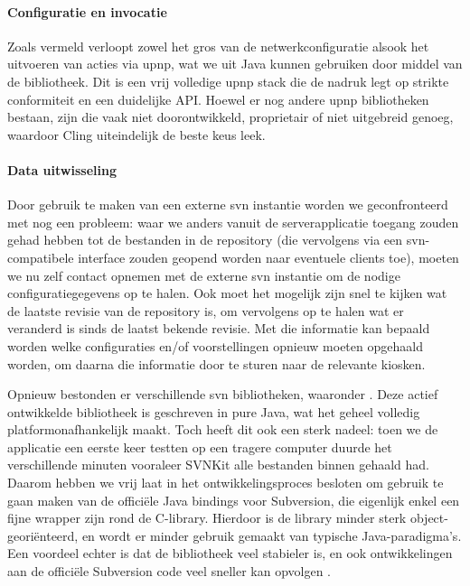 \paragraph{Configuratie en invocatie} Zoals vermeld verloopt zowel het gros van de netwerkconfiguratie alsook het uitvoeren van acties via \ac{upnp}, wat we uit Java kunnen gebruiken door middel van de  bibliotheek. Dit is een vrij volledige \ac{upnp} stack die de nadruk legt op strikte conformiteit en een duidelijke API. Hoewel er nog andere \ac{upnp} bibliotheken bestaan, zijn die vaak niet doorontwikkeld, proprietair of niet uitgebreid genoeg, waardoor Cling uiteindelijk de beste keus leek.

\paragraph{Data uitwisseling} Door gebruik te maken van een externe \ac{svn} instantie worden we geconfronteerd met nog een probleem: waar we anders vanuit de serverapplicatie toegang zouden gehad hebben tot de bestanden in de repository (die vervolgens via een \ac{svn}-compatibele interface zouden geopend worden naar eventuele clients toe), moeten we nu zelf contact opnemen met de externe \ac{svn} instantie om de nodige configuratiegegevens op te halen. Ook moet het mogelijk zijn snel te kijken wat de laatste revisie van de repository is, om vervolgens op te halen wat er veranderd is sinds de laatst bekende revisie. Met die informatie kan bepaald worden welke configuraties en/of voorstellingen opnieuw moeten opgehaald worden, om daarna die informatie door te sturen naar de relevante kiosken.

Opnieuw bestonden er verschillende \ac{svn} bibliotheken, waaronder . Deze actief ontwikkelde bibliotheek is geschreven in pure Java, wat het geheel volledig platformonafhankelijk maakt. Toch heeft dit ook een sterk nadeel: toen we de applicatie een eerste keer testten op een tragere computer duurde het verschillende minuten vooraleer SVNKit alle bestanden binnen gehaald had. Daarom hebben we vrij laat in het ontwikkelingsproces besloten om gebruik te gaan maken van de officiële Java bindings voor Subversion, die eigenlijk enkel een fijne wrapper zijn rond de C-library. Hierdoor is de library minder sterk object-georiënteerd, en wordt er minder gebruik gemaakt van typische Java-paradigma's. Een voordeel echter is dat de bibliotheek veel stabieler is, en ook ontwikkelingen aan de officiële Subversion code veel sneller kan opvolgen \citep{svn:javahl}.

